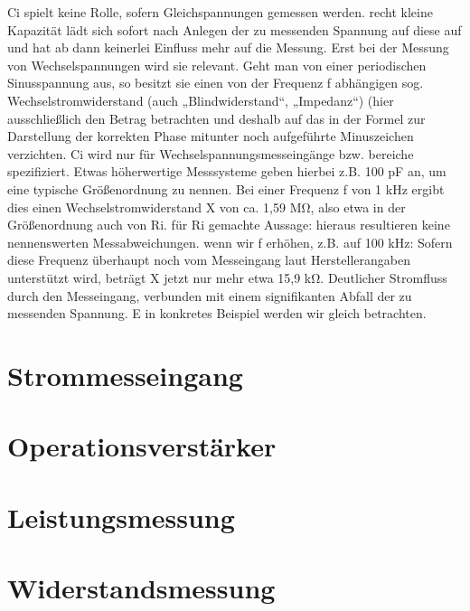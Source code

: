 \documentclass[letterpaper,10pt,english]{jupyterBook}
\begin{document}
\sphinxAtStartPar
Ci spielt keine Rolle, sofern Gleichspannungen gemessen werden.
recht kleine Kapazität lädt sich sofort nach Anlegen der zu messenden Spannung auf diese auf und hat ab dann keinerlei Einfluss mehr auf die Messung.
Erst bei der Messung von Wechselspannungen wird sie relevant. Geht man von einer periodischen Sinusspannung aus, so besitzt sie einen von der Frequenz f abhängigen sog. Wechselstromwiderstand (auch „Blindwiderstand“, „Impedanz“) (hier ausschließlich den Betrag betrachten und deshalb auf das in der Formel zur Darstellung der korrekten Phase mitunter noch aufgeführte Minuszeichen verzichten.
Ci wird nur für Wechselspannungsmesseingänge bzw. \sphinxhyphen{}bereiche spezifiziert.
Etwas höherwertige Messsysteme geben hierbei z.B. 100 pF an, um eine typische Größenordnung zu nennen.
Bei einer Frequenz f von 1 kHz ergibt dies einen Wechselstromwiderstand X von ca. 1,59 MΩ, also etwa in der Größenordnung auch von Ri.
für Ri gemachte Aussage: hieraus resultieren keine nennenswerten Messabweichungen.
wenn wir f erhöhen, z.B. auf 100 kHz:
Sofern diese Frequenz überhaupt noch vom Messeingang laut Herstellerangaben unterstützt wird, beträgt X jetzt nur mehr etwa 15,9 kΩ.
Deutlicher Stromfluss durch den Messeingang, verbunden mit einem signifikanten Abfall der zu messenden Spannung. E
in konkretes Beispiel werden wir gleich betrachten.

\sphinxstepscope


\section{Strommesseingang}
\label{\detokenize{content/4_I-Messeingang:strommesseingang}}\label{\detokenize{content/4_I-Messeingang::doc}}
\sphinxstepscope


\section{Operationsverstärker}
\label{\detokenize{content/4_OP:operationsverstarker}}\label{\detokenize{content/4_OP::doc}}
\sphinxstepscope


\section{Leistungsmessung}
\label{\detokenize{content/4_P-Messung:leistungsmessung}}\label{\detokenize{content/4_P-Messung::doc}}
\sphinxstepscope


\section{Widerstandsmessung}
\label{\detokenize{content/4_R-Messung:widerstandsmessung}}\label{\detokenize{content/4_R-Messung::doc}}
\sphinxstepscope
\end{document}
